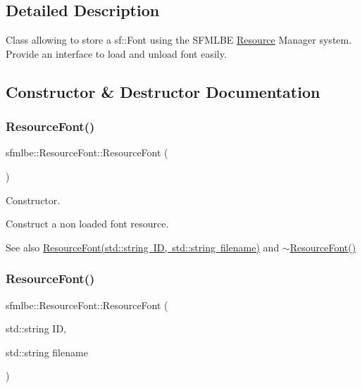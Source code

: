 \subsection{Detailed Description}
Class allowing to store a sf\+::\+Font using the S\+F\+M\+L\+BE \mbox{\hyperlink{classsfmlbe_1_1_resource}{Resource}} Manager system. Provide an interface to load and unload font easily. 

\subsection{Constructor \& Destructor Documentation}
\mbox{\label{classsfmlbe_1_1_resource_font_a1b841c5e14a228a10db8a3d8c6ef2b0b}} 
\subsubsection{\texorpdfstring{Resource\+Font()}{ResourceFont()}\hspace{0.1cm}{\footnotesize\ttfamily [1/2]}}
{\footnotesize\ttfamily sfmlbe\+::\+Resource\+Font\+::\+Resource\+Font (\begin{DoxyParamCaption}{ }\end{DoxyParamCaption})}



Constructor. 

Construct a non loaded font resource. \begin{DoxySeeAlso}{See also}
\mbox{\hyperlink{classsfmlbe_1_1_resource_font_ad29b31b52682209630a6a8bba1999200}{Resource\+Font(std\+::string I\+D, std\+::string filename)}} and \mbox{\hyperlink{classsfmlbe_1_1_resource_font_a01aa16c3fae9a4027620308008ebbce0}{$\sim$\+Resource\+Font()}} 
\end{DoxySeeAlso}
\mbox{\label{classsfmlbe_1_1_resource_font_ad29b31b52682209630a6a8bba1999200}} 
\subsubsection{\texorpdfstring{Resource\+Font()}{ResourceFont()}\hspace{0.1cm}{\footnotesize\ttfamily [2/2]}}
{\footnotesize\ttfamily sfmlbe\+::\+Resource\+Font\+::\+Resource\+Font (\begin{DoxyParamCaption}\item[{std\+::string}]{ID,  }\item[{std\+::string}]{filename }\end{DoxyParamCaption})}



